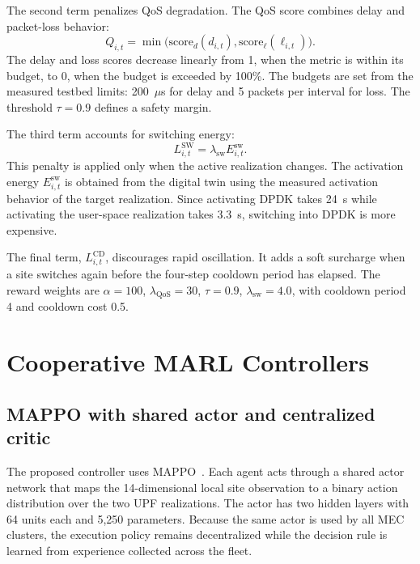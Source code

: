 \documentclass[10pt,conference,letterpaper]{IEEEtran}
\begin{document}
The second term penalizes QoS degradation. The QoS score combines delay and packet-loss behavior:
\begin{equation}
Q_{i,t}
=
\min\bigl(
\mathrm{score}_{d}(d_{i,t}),
\mathrm{score}_{\ell}(\ell_{i,t})
\bigr).
\end{equation}
The delay and loss scores decrease linearly from 1, when the metric is within its budget, to 0, when the budget is exceeded by 100\%. The budgets are set from the measured testbed limits: 200~$\mu$s for delay and 5 packets per interval for loss. The threshold $\tau=0.9$ defines a safety margin.

The third term accounts for switching energy:
\begin{equation}
L^{\mathrm{SW}}_{i,t}
=
\lambda_{\mathrm{sw}} E^{\mathrm{sw}}_{i,t}.
\end{equation}
This penalty is applied only when the active realization changes. The activation energy $E^{\mathrm{sw}}_{i,t}$ is obtained from the digital twin using the measured activation behavior of the target realization. Since activating DPDK takes 24~s while activating the user-space realization takes 3.3~s, switching into DPDK is more expensive.

The final term, $L^{\mathrm{CD}}_{i,t}$, discourages rapid oscillation. It adds a soft surcharge when a site switches again before the four-step cooldown period has elapsed. The reward weights are
$\alpha=100$, $\lambda_{\mathrm{QoS}}=30$, $\tau=0.9$,
$\lambda_{\mathrm{sw}}=4.0$, with cooldown period 4 and cooldown cost 0.5.

\section{Cooperative MARL Controllers}
\label{sec:method}

\subsection{MAPPO with shared actor and centralized critic}

The proposed controller uses MAPPO~\cite{ref:mappo}. Each agent acts through a
shared actor network that maps the 14-dimensional local site observation to a
binary action distribution over the two UPF realizations. The actor has two
hidden layers with 64 units each and 5,250 parameters. Because the same actor is
used by all MEC clusters, the execution policy remains decentralized while the
decision rule is learned from experience collected across the fleet.
\end{document}
